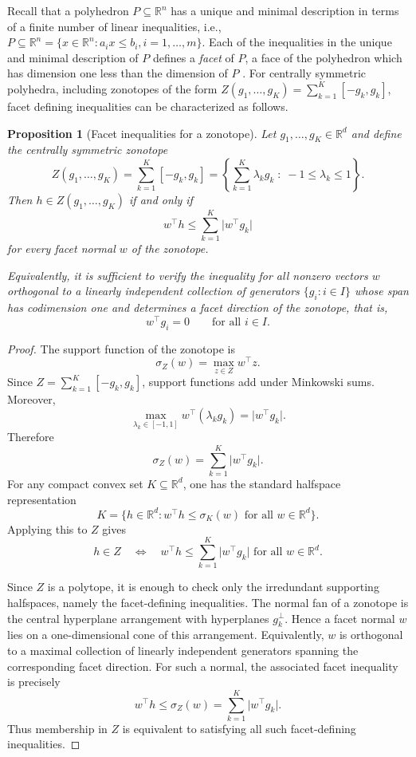 \documentclass{article}
\newtheorem{proposition}[theorem]{Proposition}
\theoremstyle{definition}
\theoremstyle{remark}
\begin{document}
    Recall that a polyhedron $P \subseteq \mathbb{R}^n$ has a unique and minimal description in terms of a finite number of linear inequalities, i.e., $P \subseteq \mathbb{R}^n = \{ x \in \mathbb{R}^n: a_ix \leq b_i, i = 1, \dots, m\}$. 
%    
    Each of the inequalities in the unique and minimal description of $P$ defines a \textit{facet} of $P$, a face of the polyhedron which has dimension one less than the dimension of $P$ \citep[Proposition~9.2]{wolsey_integer_2020}. 
%    
    For centrally symmetric polyhedra, including zonotopes of the form $Z(g_1,\ldots, g_K) = \sum_{k=1}^K[-g_k,g_k]$, facet defining inequalities can be characterized as follows. 

\begin{proposition}[Facet inequalities for a zonotope]
\label{prop:zonotope_facet_inequalities}
Let $g_1,\ldots,g_K\in\mathbb R^d$ and define the centrally symmetric zonotope
\[
    Z(g_1,\ldots,g_K)
    =
    \sum_{k=1}^K[-g_k,g_k]
    =
    \left\{
        \sum_{k=1}^K \lambda_k g_k
        \;:\;
        -1\le \lambda_k\le 1
    \right\}.
\]
Then $h\in Z(g_1,\ldots,g_K)$ if and only if
\[
    w^\top h
    \le
    \sum_{k=1}^K \vert w^\top g_k\vert 
\]
for every facet normal $w$ of the zonotope.

Equivalently, it is sufficient to verify the inequality for all nonzero
vectors $w$ orthogonal to a linearly independent collection of generators
$\{g_i : i\in I\}$ whose span has codimension one and determines a facet direction of the zonotope, that is,
\[
    w^\top g_i =0
    \qquad\text{for all }i\in I.
\]
\end{proposition}


\begin{proof}
The support function of the zonotope is
\[
    \sigma_Z(w)
    =
    \max_{z\in Z} w^\top z.
\]
Since $Z=\sum_{k=1}^K[-g_k,g_k]$, support functions add under Minkowski sums.
Moreover,
\[
    \max_{\lambda_k\in[-1,1]} w^\top(\lambda_k g_k)
    =
    \vert w^\top g_k\vert .
\]
Therefore
\[
    \sigma_Z(w)
    =
    \sum_{k=1}^K \vert w^\top g_k\vert .
\]
For any compact convex set $K\subseteq\mathbb R^d$, one has the standard
halfspace representation
\[
    K
    =
    \{h\in\mathbb R^d : w^\top h\le \sigma_K(w)
    \text{ for all }w\in\mathbb R^d\}.
\]
Applying this to $Z$ gives
\[
    h\in Z
    \quad\Longleftrightarrow\quad
    w^\top h\le \sum_{k=1}^K \vert w^\top g_k\vert 
    \text{ for all }w\in\mathbb R^d.
\]

Since $Z$ is a polytope, it is enough to check only the irredundant supporting
halfspaces, namely the facet-defining inequalities. The normal fan of a
zonotope is the central hyperplane arrangement with hyperplanes
$g_k^\perp$. Hence a facet normal $w$ lies on a one-dimensional cone of this
arrangement. Equivalently, $w$ is orthogonal to a maximal collection of
linearly independent generators spanning the corresponding facet direction.
For such a normal, the associated facet inequality is precisely
\[
    w^\top h\le \sigma_Z(w)
    =
    \sum_{k=1}^K \vert w^\top g_k\vert .
\]
Thus membership in $Z$ is equivalent to satisfying all such facet-defining
inequalities.
\end{proof}
\end{document}
